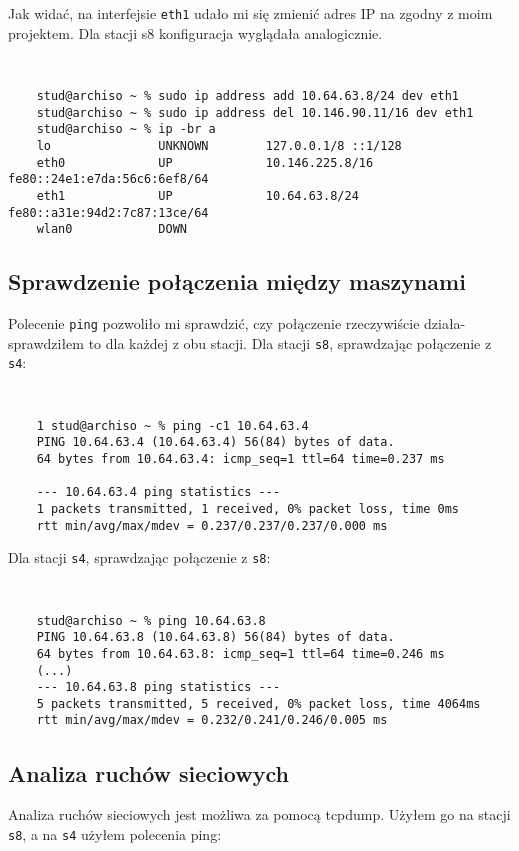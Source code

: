 \documentclass[a4paper,11pt]{article}
\begin{document}
Jak widać, na interfejsie {\tt eth1} udało mi się zmienić adres IP na zgodny z moim projektem. Dla stacji s8 konfiguracja wyglądała analogicznie.

{\tt
\begin{verbatim}
    stud@archiso ~ % sudo ip address add 10.64.63.8/24 dev eth1
    stud@archiso ~ % sudo ip address del 10.146.90.11/16 dev eth1
    stud@archiso ~ % ip -br a
    lo               UNKNOWN        127.0.0.1/8 ::1/128
    eth0             UP             10.146.225.8/16 fe80::24e1:e7da:56c6:6ef8/64
    eth1             UP             10.64.63.8/24 fe80::a31e:94d2:7c87:13ce/64
    wlan0            DOWN
\end{verbatim}
}

\subsection{Sprawdzenie połączenia między maszynami}

Polecenie {\tt ping} pozwoliło mi sprawdzić, czy połączenie rzeczywiście działa- sprawdziłem to dla każdej z obu stacji.
Dla stacji {\tt s8}, sprawdzając połączenie z {\tt s4}:

{\tt
\begin{verbatim}
    1 stud@archiso ~ % ping -c1 10.64.63.4
    PING 10.64.63.4 (10.64.63.4) 56(84) bytes of data.
    64 bytes from 10.64.63.4: icmp_seq=1 ttl=64 time=0.237 ms
    
    --- 10.64.63.4 ping statistics ---
    1 packets transmitted, 1 received, 0% packet loss, time 0ms
    rtt min/avg/max/mdev = 0.237/0.237/0.237/0.000 ms
\end{verbatim}
}

Dla stacji {\tt s4}, sprawdzając połączenie z {\tt s8}:

{\tt
\begin{verbatim}
    stud@archiso ~ % ping 10.64.63.8
    PING 10.64.63.8 (10.64.63.8) 56(84) bytes of data.
    64 bytes from 10.64.63.8: icmp_seq=1 ttl=64 time=0.246 ms
    (...)
    --- 10.64.63.8 ping statistics ---
    5 packets transmitted, 5 received, 0% packet loss, time 4064ms
    rtt min/avg/max/mdev = 0.232/0.241/0.246/0.005 ms
\end{verbatim}
}

\subsection{Analiza ruchów sieciowych}

Analiza ruchów sieciowych jest możliwa za pomocą tcpdump. Użyłem go na stacji {\tt s8}, a na {\tt s4} użyłem polecenia ping:
\end{document}
